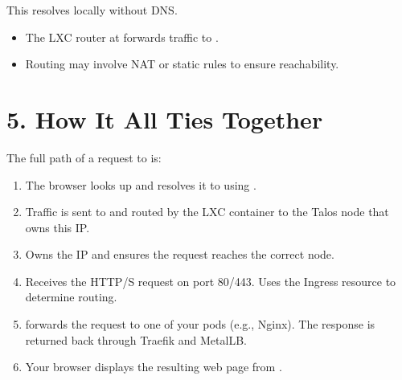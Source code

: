 \documentclass[letterpaper,10pt,english]{sphinxmanual}
\begin{document}
\sphinxAtStartPar
This resolves  locally without DNS.

\sphinxAtStartPar
{}
\begin{itemize}
\item {} 
\sphinxAtStartPar
The LXC router at  forwards traffic to .

\item {} 
\sphinxAtStartPar
Routing may involve NAT or static rules to ensure reachability.

\end{itemize}


\section{5. How It All Ties Together}
\label{\detokenize{setup:how-it-all-ties-together}}
\sphinxAtStartPar
The full path of a request to  is:
\begin{enumerate}
%
\item {} 
\sphinxAtStartPar
{}
\sphinxhyphen{} The browser looks up  and resolves it to  using .

\item {} 
\sphinxAtStartPar
{}
\sphinxhyphen{} Traffic is sent to  and routed by the LXC container to the Talos node that owns this IP.

\item {} 
\sphinxAtStartPar
{}
\sphinxhyphen{} Owns the  IP and ensures the request reaches the correct node.

\item {} 
\sphinxAtStartPar
{}
\sphinxhyphen{} Receives the HTTP/S request on port 80/443.
\sphinxhyphen{} Uses the Ingress resource to determine routing.

\item {} 
\sphinxAtStartPar
{}
\sphinxhyphen{}  forwards the request to one of your pods (e.g., Nginx).
\sphinxhyphen{} The response is returned back through Traefik and MetalLB.

\item {} 
\sphinxAtStartPar
{}
\sphinxhyphen{} Your browser displays the resulting web page from .

\end{enumerate}
\end{document}

